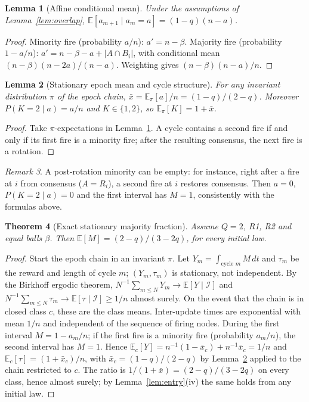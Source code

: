 \documentclass[aps,pre,onecolumn,superscriptaddress,amsmath,amssymb,longbibliography]{revtex4-2}
\newtheorem{theorem}{Theorem}[section]
\newtheorem{lemma}[theorem]{Lemma}
\theoremstyle{definition}
\theoremstyle{remark}
\newtheorem{remark}[theorem]{Remark}
\newcommand{\E}{\mathbb{E}}
\begin{document}
\begin{lemma}[Affine conditional mean]
\label{lem:affine}
Under the assumptions of Lemma~\ref{lem:overlap},
$\E[a_{m+1}\mid a_m=a]=(1-q)(n-a)$.
\end{lemma}
\begin{proof}
Minority fire (probability $a/n$): $a'=n-\beta$. Majority fire
(probability $1-a/n$): $a'=n-\beta-a+|A\cap B_i|$, with conditional mean
$(n-\beta)(n-2a)/(n-a)$. Weighting gives $(n-\beta)(n-a)/n$.
\end{proof}

\begin{lemma}[Stationary epoch mean and cycle structure]
\label{lem:xbar}
For any invariant distribution $\pi$ of the epoch chain,
$\bar x=\E_\pi[a]/n=(1-q)/(2-q)$. Moreover $P(K=2\mid a)=a/n$ and
$K\in\{1,2\}$, so $\E_\pi[K]=1+\bar x$.
\end{lemma}
\begin{proof}
Take $\pi$-expectations in Lemma~\ref{lem:affine}. A cycle contains a
second fire if and only if its first fire is a minority fire; after the
resulting consensus, the next fire is a rotation.
\end{proof}

\begin{remark}
\label{rem:emptyminority}
A post-rotation minority can be empty: for instance, right after a fire
at $i$ from consensus ($A=R_i$), a second fire at $i$ restores
consensus. Then $a=0$, $P(K=2\mid a)=0$ and the first interval has
$M=1$, consistently with the formulas above.
\end{remark}

\begin{theorem}[Exact stationary majority fraction]
\label{thm:band}
Assume $Q=2$, R1, R2 and equal balls $\beta$. Then
$\E[M]=(2-q)/(3-2q)$, for every initial law.
\end{theorem}
\begin{proof}
Start the epoch chain in an invariant $\pi$. Let $Y_m=\int_{\text{cycle }m}M\,dt$
and $\tau_m$ be the reward and length of cycle $m$; $(Y_m,\tau_m)$ is
stationary, not independent. By the Birkhoff ergodic theorem,
$N^{-1}\sum_{m\le N}Y_m\to\E[Y\mid\mathcal I]$ and
$N^{-1}\sum_{m\le N}\tau_m\to\E[\tau\mid\mathcal I]\ge1/n$ almost
surely. On the event that the chain is in closed class $c$, these are
the class means. Inter-update times are exponential with mean $1/n$ and
independent of the sequence of firing nodes. During the first interval
$M=1-a_m/n$; if the first fire is a minority fire (probability $a_m/n$),
the second interval has $M=1$. Hence $\E_c[Y]=n^{-1}(1-\bar x_c)+n^{-1}\bar x_c=1/n$
and $\E_c[\tau]=(1+\bar x_c)/n$, with $\bar x_c=(1-q)/(2-q)$ by
Lemma~\ref{lem:xbar} applied to the chain restricted to $c$. The ratio
is $1/(1+\bar x)=(2-q)/(3-2q)$ on every class, hence almost surely; by
Lemma~\ref{lem:entry}(iv) the same holds from any initial law.
\end{proof}
\end{document}
